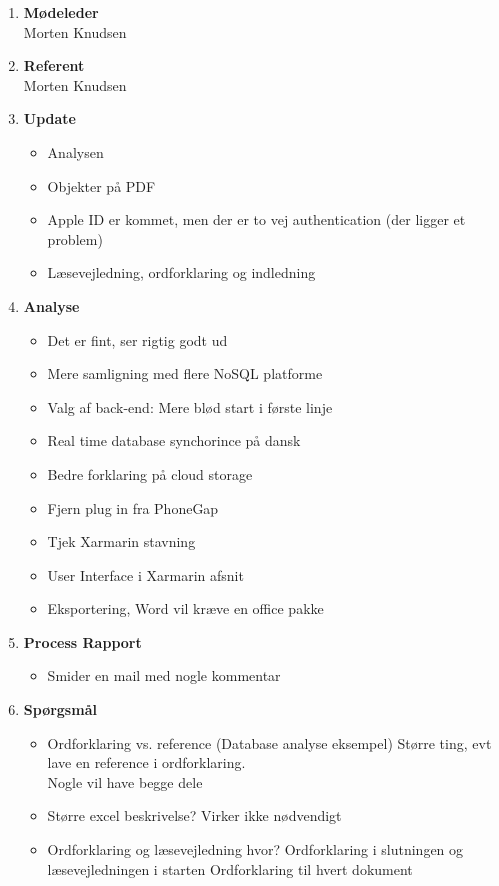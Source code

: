 	\begin{enumerate}
		\itemsep 0.3em 
		\item \textbf{Mødeleder}\\
			Morten Knudsen
		\item \textbf{Referent}\\
			Morten Knudsen

		\item \textbf{Update}
			\begin{itemize}[-]
				\item Analysen
				\item Objekter på PDF
				\item Apple ID er kommet, men der er to vej authentication (der ligger et problem)
				\item Læsevejledning, ordforklaring og indledning
			\end{itemize}
	
		\item \textbf{Analyse}
		\begin{itemize}[-]
			\item Det er fint, ser rigtig godt ud
			\item Mere samligning med flere NoSQL platforme
			\item Valg af back-end: Mere blød start i første linje
			\item Real time database synchorince på dansk
			\item Bedre forklaring på cloud storage
			
			\item Fjern plug in fra PhoneGap
			\item Tjek Xarmarin stavning
			\item User Interface i Xarmarin afsnit
			
			\item Eksportering, Word vil kræve en office pakke
		\end{itemize}
	
			\item \textbf{Process Rapport}
		\begin{itemize}[-]
			\item Smider en mail med nogle kommentar
		\end{itemize}
	
		\item \textbf{Spørgsmål}
			\begin{itemize}[-]
				\item Ordforklaring vs. reference (Database analyse eksempel)
				Større ting, evt lave en reference i ordforklaring. \\
				Nogle vil have begge dele
				\item Større excel beskrivelse?
				Virker ikke nødvendigt
				\item Ordforklaring og læsevejledning hvor?
				Ordforklaring i slutningen og læsevejledningen i starten
				Ordforklaring til hvert dokument
			\end{itemize}
	

\end{enumerate}

